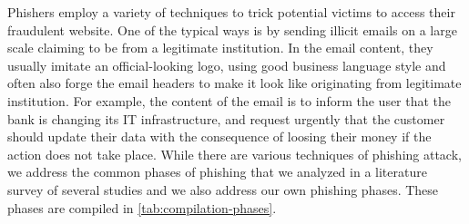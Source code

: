 Phishers employ a variety of techniques to trick potential victims
to access their fraudulent website. One of the typical ways is by
sending illicit emails on a large scale claiming to be from a legitimate
institution. In the email content, they usually imitate an official-looking
logo, using good business language style and often also forge the
email headers to make it look like originating from legitimate institution.
For example, the content of the email is to inform the user that the
bank is changing its IT infrastructure, and request urgently that
the customer should update their data with the consequence of loosing
their money if the action does not take place. While there are various
techniques of phishing attack, we address the common phases of phishing
that we analyzed in a literature survey of several studies and we
also address our own phishing phases. These phases are compiled in
\autoref{tab:compilation-phases}.

